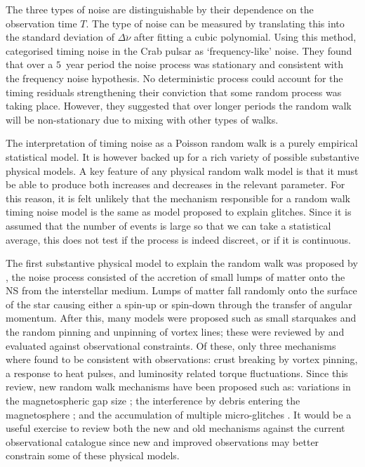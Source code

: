 The three types of noise are distinguishable by their dependence on the
observation time $T$. The type of noise can be measured by translating this
into the standard deviation of $\Delta\ddot{\nu}$ after fitting a cubic polynomial.
Using this method, \citet{Boynton1972} categorised timing noise in
the Crab pulsar as `frequency-like' noise.  They found that over a $5$~year
period the noise process was stationary and consistent with the frequency noise
hypothesis. No deterministic process could account for the timing residuals
strengthening their conviction that some random process was taking place.
However, they suggested that over longer periods the random walk will be
non-stationary due to mixing with other types of walks.

The interpretation of timing noise as a Poisson random walk is a purely
empirical statistical model. It is however backed up for a rich variety of
possible substantive physical models.  A key feature of any physical random
walk model is that it must be able to produce both increases and decreases in
the relevant parameter. For this reason, it is felt unlikely that the mechanism
responsible for a random walk timing noise model is the same as model proposed
to explain glitches. Since it is assumed that the number of events
is large so that we can take a statistical average, this does not test if the
process is indeed discreet, or if it is continuous.

The first substantive physical model to explain the random walk was proposed by
\citet{Boynton1972}, the noise process consisted of the accretion of small
lumps of matter onto the NS from the interstellar medium. Lumps of matter fall
randomly onto the surface of the star causing either a spin-up or spin-down
through the transfer of angular momentum. After this, many models were proposed
such as small starquakes and the random pinning and unpinning of vortex lines; these
were reviewed by \citet{Cordes1981} and evaluated against observational
constraints. Of these, only three mechanisms where found to be consistent with
observations: crust breaking by vortex pinning, a response to heat pulses, and
luminosity related torque fluctuations. Since this review, new random walk
mechanisms have been proposed such as: variations in the magnetospheric gap
size \citep{Cheng1987}; the interference by debris entering the magnetosphere
\citep{Cordes2008}; and the accumulation of multiple micro-glitches
\citep{Janssen2006}. It would be a useful exercise to review both the new and
old mechanisms against the current observational catalogue since new and
improved observations may better constrain some of these physical models.

